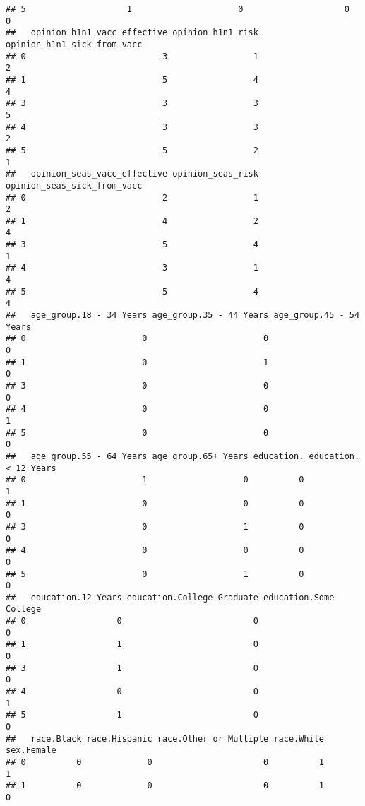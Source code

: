 \documentclass[
]{article}
\begin{document}
\begin{verbatim}
## 5                    1                     0                    0             0
##   opinion_h1n1_vacc_effective opinion_h1n1_risk opinion_h1n1_sick_from_vacc
## 0                           3                 1                           2
## 1                           5                 4                           4
## 3                           3                 3                           5
## 4                           3                 3                           2
## 5                           5                 2                           1
##   opinion_seas_vacc_effective opinion_seas_risk opinion_seas_sick_from_vacc
## 0                           2                 1                           2
## 1                           4                 2                           4
## 3                           5                 4                           1
## 4                           3                 1                           4
## 5                           5                 4                           4
##   age_group.18 - 34 Years age_group.35 - 44 Years age_group.45 - 54 Years
## 0                       0                       0                       0
## 1                       0                       1                       0
## 3                       0                       0                       0
## 4                       0                       0                       1
## 5                       0                       0                       0
##   age_group.55 - 64 Years age_group.65+ Years education. education.< 12 Years
## 0                       1                   0          0                    1
## 1                       0                   0          0                    0
## 3                       0                   1          0                    0
## 4                       0                   0          0                    0
## 5                       0                   1          0                    0
##   education.12 Years education.College Graduate education.Some College
## 0                  0                          0                      0
## 1                  1                          0                      0
## 3                  1                          0                      0
## 4                  0                          0                      1
## 5                  1                          0                      0
##   race.Black race.Hispanic race.Other or Multiple race.White sex.Female
## 0          0             0                      0          1          1
## 1          0             0                      0          1          0

\end{verbatim}
\end{document}
